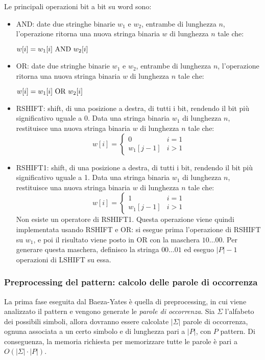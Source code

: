 Le principali operazioni bit a bit su word sono:
\begin{itemize}
    \item AND: date due stringhe binarie $w_1$ e $w_2$, entrambe di lunghezza $n$, l'operazione ritorna una nuova stringa binaria $w$ di lunghezza $n$ tale che:
    \begin{center}
        $w[i] = w_1[i] \textnormal{ AND } w_2[i]$
    \end{center}
    \item OR: date due stringhe binarie $w_1$ e $w_2$, entrambe di lunghezza $n$, l'operazione ritorna una nuova stringa binaria $w$ di lunghezza $n$ tale che:
    \begin{center}
        $w[i] = w_1[i] \textnormal{ OR } w_2[i]$
    \end{center}
    \item RSHIFT: shift, di una posizione a destra, di tutti i bit, rendendo il bit più significativo uguale a 0.
    Data una stringa binaria $w_1$ di lunghezza $n$, restituisce una nuova stringa binaria $w$ di lunghezza $n$ tale che:
    \begin{equation*}
        w[i] = \begin{cases}
            0 & i = 1 \\
            w_1[j-1] & i > 1
        \end{cases}
    \end{equation*}
    \item RSHIFT1: shift, di una posizione a destra, di tutti i bit, rendendo il bit più significativo uguale a 1.
    Data una stringa binaria $w_1$ di lunghezza $n$, restituisce una nuova stringa binaria $w$ di lunghezza $n$ tale che:
    \begin{equation*}
        w[i] = \begin{cases}
            1 & i = 1 \\
            w_1[j-1] & i > 1
        \end{cases}
    \end{equation*}
    Non esiste un operatore di RSHIFT1. Questa operazione viene quindi implementata usando RSHIFT e OR:
    si esegue prima l'operazione di RSHIFT su $w_1$, e poi il risultato viene posto in OR con la maschera $10\ldots00$.
    Per generare questa maschera, definisco la stringa $00\ldots01$ ed eseguo $|P|- 1$ operazioni di LSHIFT su essa.
\end{itemize}

\subsubsection{Preprocessing del pattern: calcolo delle parole di occorrenza}
La prima fase eseguita dal Baeza-Yates è quella di preprocessing, in cui viene analizzato il pattern e vengono generate le \textit{parole di occorrenza}.
Sia $\Sigma$ l'alfabeto dei possibili simboli, allora dovranno essere calcolate $|\Sigma|$ parole di occorrenza, ognuna associata a un certo simbolo e di lunghezza pari a $|P|$, con $P$ pattern.
Di conseguenza, la memoria richiesta per memorizzare tutte le parole è pari a $O(|\Sigma| \cdot |P|)$.

